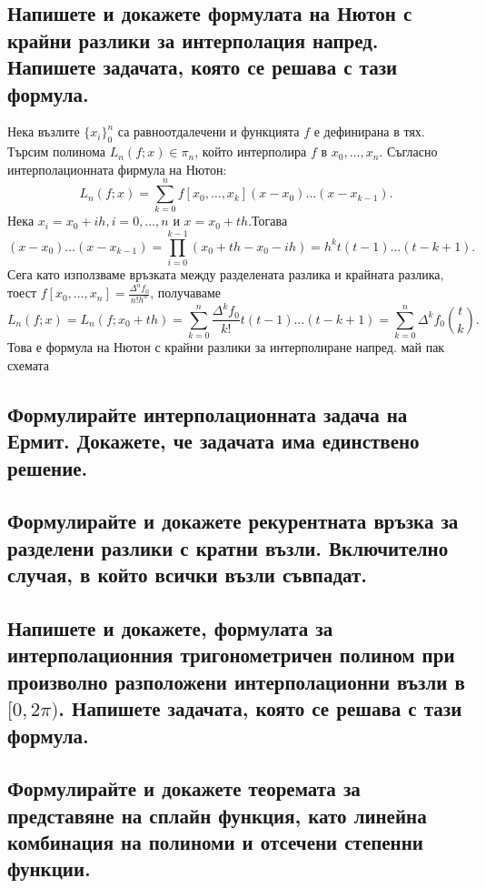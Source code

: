\documentclass[12pt]{article}
\numberwithin{equation}{subsection}
\numberwithin{theorem}{subsection}
\numberwithin{definition}{subsection}
\numberwithin{corollary}{subsection}
\begin{document}
\subsection{Напишете и докажете формулата на Нютон с крайни разлики за интерполация напред. Напишете задачата, която се решава с тази формула.}
  Нека възлите $\{x_i\}_0^n$ са равноотдалечени и функцията $f$ е дефинирана в тях. Търсим полинома $L_n(f;x)\in\pi_n$, който интерполира $f$ в $x_0,\ldots,x_n$. Съгласно интерполационната фирмула на Нютон:
  \begin{equation*}
    L_n(f;x)=\sum_{k=0}^{n}f[x_0,\ldots,x_k](x-x_0)\ldots(x-x_{k-1}).
  \end{equation*}
  Нека $x_i=x_0 + ih, i=0,\ldots,n$ и $x = x_0+th$.Тогава
  \begin{equation*}
    (x-x_0)\ldots(x-x_{k-1})=\prod_{i=0}^{k-1}(x_0+th-x_0-ih)=h^kt(t-1)\ldots(t-k+1).
  \end{equation*}
  Сега като използваме връзката между разделената разлика и крайната разлика, тоест $f[x_0,\ldots,x_n]=\frac{\Delta^nf_0}{n!h^n}$, получаваме
  \begin{equation*}
    L_n(f;x)=L_n(f;x_0+th)=\sum_{k=0}^{n}\frac{\Delta^kf_0}{k!}t(t-1)\ldots(t-k+1)=\boxed{\sum_{k=0}^{n}\Delta^kf_0\genfrac(){0pt}{0}{t}{k}}.
  \end{equation*}
  Това е формула на Нютон с крайни разлики за интерполиране напред.
  май пак схемата

\subsection{Формулирайте интерполационната задача на Ермит. Докажете, че задачата има единствено решение.}

\subsection{Формулирайте и докажете рекурентната връзка за разделени разлики с кратни възли. Включително случая, в който всички възли съвпадат.}

\subsection{Напишете и докажете, формулата за интерполационния тригонометричен полином при произволно разположени интерполационни възли в $[0, 2\pi)$. Напишете задачата, която се решава с тази формула.}
\subsection{Формулирайте и докажете теоремата за представяне на сплайн функция,
като линейна комбинация на полиноми и отсечени степенни функции.}
\end{document}
